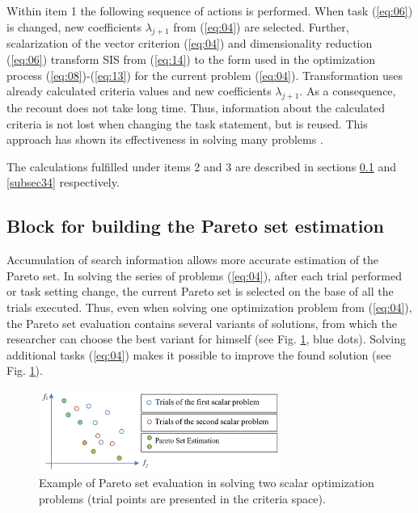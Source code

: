 \documentclass[runningheads]{llncs}
\begin{document}
Within item 1 the following sequence of actions is performed. When task (\ref{eq:06}) is changed, new coefficients $\lambda_{j+1}$ from (\ref{eq:04}) are selected. Further, scalarization of the vector criterion (\ref{eq:04}) and dimensionality reduction (\ref{eq:06}) transform SIS from (\ref{eq:14}) to the form used in the optimization process (\ref{eq:08})-(\ref{eq:13}) for the current problem (\ref{eq:04}). Transformation uses already calculated criteria values and new coefficients $\lambda_{j+1}$. As a consequence, the recount does not take long time. Thus, information about the calculated criteria is not lost when changing the task statement, but is reused. This approach has shown its effectiveness in solving many problems \cite{Konnov2025,Gergel2018,GergelKozinov2020}.

The calculations fulfilled under items 2 and 3 are described in sections \ref{subsec33} and \ref{subsec34} respectively.

\subsection{Block for building the Pareto set estimation}
\label{subsec33}

Accumulation of search information allows more accurate estimation of the Pareto set. In solving the series of problems (\ref{eq:04}), after each trial performed or task setting change, the current Pareto set is selected on the base of all the trials executed. Thus, even when solving one optimization problem from (\ref{eq:04}), the Pareto set evaluation contains several variants of solutions, from which the researcher can choose the best variant for himself (see Fig. \ref{fig2}, blue dots). Solving additional tasks (\ref{eq:04}) makes it possible to improve the found solution (see Fig. \ref{fig2}).

\begin{figure}[t]
\center
\includegraphics[width=0.7\textwidth]{fig2.png}
\caption{Example of Pareto set evaluation in solving two scalar optimization problems (trial points are presented in the criteria space).} \label{fig2}
\end{figure}
\end{document}
